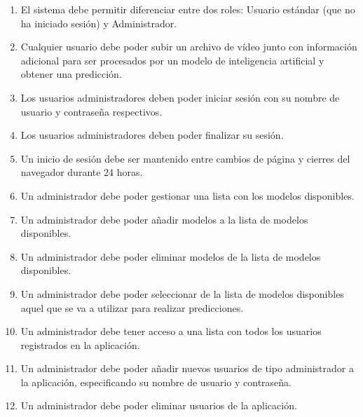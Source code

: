 \begin{enumerate}[start=1,label={\bfseries RF\arabic*:}]
    \item El sistema debe permitir diferenciar entre dos roles: Usuario estándar
          (que no ha iniciado sesión) y Administrador.

          
    \item Cualquier usuario debe poder subir un archivo de vídeo junto con
          información adicional para ser procesados por un modelo de
          inteligencia artificial y obtener una predicción.


    \item Los usuarios administradores deben poder iniciar sesión con su nombre
          de usuario y contraseña respectivos.
    \item Los usuarios administradores deben poder finalizar su sesión.
    \item Un inicio de sesión debe ser mantenido entre cambios de página y
          cierres del navegador durante 24 horas.
    \item Un administrador debe poder gestionar una lista con los modelos
          disponibles.


    \item Un administrador debe poder añadir modelos a la lista de modelos
          disponibles.
    \item Un administrador debe poder eliminar modelos de la lista de modelos
          disponibles.
    \item Un administrador debe poder seleccionar de la lista de modelos
          disponibles aquel que se va a utilizar para realizar predicciones.
    \item Un administrador debe tener acceso a una lista con todos los usuarios
          registrados en la aplicación.


    \item Un administrador debe poder añadir nuevos usuarios de tipo
          administrador a la aplicación, especificando su nombre de usuario y
          contraseña.
    \item Un administrador debe poder eliminar usuarios de la aplicación.
\end{enumerate}


